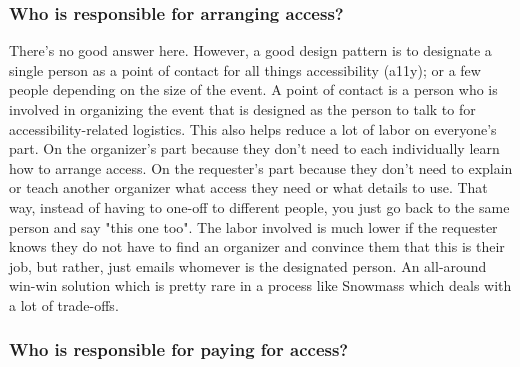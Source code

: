 \documentclass{article}
\begin{document}
  \subsubsection{Who is responsible for arranging access?}

  There's no good answer here. However, a good design pattern is to designate a single person as a point of contact for all things accessibility (a11y); or a few people depending on the size of the event. A point of contact is a person who is involved in organizing the event that is designed as the person to talk to for accessibility-related logistics. This also helps reduce a lot of labor on everyone's part. On the organizer's part because they don't need to each individually learn how to arrange access. On the requester's part because they don't need to explain or teach another organizer what access they need or what details to use. That way, instead of having to one-off to different people, you just go back to the same person and say "this one too". The labor involved is much lower if the requester knows they do not have to find an organizer and convince them that this is their job, but rather, just emails whomever is the designated person. An all-around win-win solution which is pretty rare in a process like Snowmass which deals with a lot of trade-offs.

  \subsubsection{Who is responsible for paying for access?}
\end{document}
